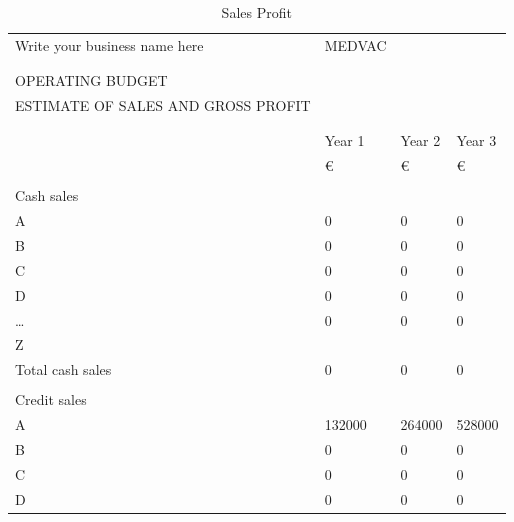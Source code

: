 \documentclass{article}
\begin{document}
\begin{table}[H]
\centering
\caption{Sales Profit}
\label{my-label}
\begin{tabular}{llll}
Write your business name here      & MEDVAC &        &        \\
                                   &        &        &        \\
                                   &        &        &        \\
OPERATING BUDGET                   &        &        &        \\
ESTIMATE OF SALES AND GROSS PROFIT &        &        &        \\
                                   &        &        &        \\
                                   &        &        &        \\
                                   & Year 1 & Year 2 & Year 3 \\
                                   & €      & €      & €      \\
                                   &        &        &        \\
Cash sales                         &        &        &        \\
A                                  & 0      & 0      & 0      \\
B                                  & 0      & 0      & 0      \\
C                                  & 0      & 0      & 0      \\
D                                  & 0      & 0      & 0      \\
…                                  & 0      & 0      & 0      \\
Z                                  &        &        &        \\
Total cash sales                   & 0      & 0      & 0      \\
                                   &        &        &        \\
Credit sales                       &        &        &        \\
A                                  & 132000 & 264000 & 528000 \\
B                                  & 0      & 0      & 0      \\
C                                  & 0      & 0      & 0      \\
D                                  & 0      & 0      & 0      \\

\end{tabular}
\end{table}
\end{document}
